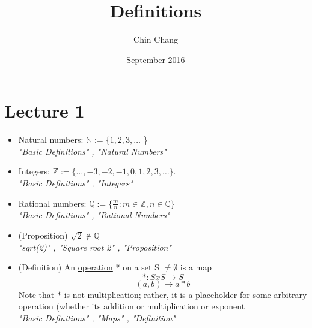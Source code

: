 \documentclass{article}
\title{Definitions}
\author{Chin Chang}
\date{September 2016}
\begin{document}
\maketitle

\section{Lecture 1}
\begin{itemize}
    \item Natural numbers: $\mathbb{N} := \{ 1,2,3,\ldots$ \} \\
    \vspace{0.25cm} \textit{"Basic Definitions" , "Natural Numbers"}
    
    \item Integers: $ \mathbb{Z} := \{ \ldots, -3,-2,-1,0,1,2,3,\ldots \}$. \\
    \vspace{0.25cm} \textit{"Basic Definitions" , "Integers"}
    
    \item Rational numbers: $ \mathbb{Q} := \{ \frac{m}{n} : m \in \mathbb{Z} , n \in \mathbb{Q} \}$ \\
    \vspace{0.25cm} \textit{"Basic Definitions" , "Rational Numbers"}
    
    \item (Proposition) $\sqrt{2} \notin \mathbb{Q} $ \\
    \vspace{0.25cm} \textit{"sqrt(2)" , "Square root 2" , "Proposition"}
    
    \item (Definition) An \underline{operation} * on a set S $\neq \emptyset$ is a map $$*: S x S \rightarrow S$$ $$(a,b) \rightarrow a*b$$
    Note that $*$ is not multiplication; rather, it is a placeholder for some arbitrary operation (whether its addition or multiplication or exponent \\
    \vspace{0.25cm} \textit{"Basic Definitions" , "Maps" , "Definition"}
    

\end{itemize}
\end{document}
